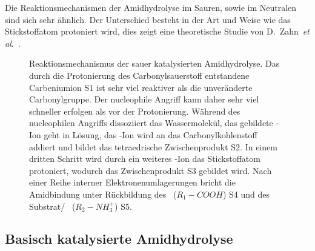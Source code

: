 Die Reaktionsmechanismen der Amidhydrolyse im Sauren, sowie im Neutralen sind sich sehr ähnlich. Der Unterschied besteht in der Art und Weise wie das Stickstoffatom protoniert wird, dies zeigt eine theoretische Studie von D.~Zahn~\textit{et al}.~\cites{Zahn.2004b}.

\begin{figure}[H]
	\begin{flushleft}
	\end{flushleft}
	\caption[Reaktionsmechanismus der sauer katalysierten Amidhydrolyse]{Reaktionsmechanismus der sauer katalysierten Amidhydrolyse. Das durch die Protonierung des Carbonylsauerstoff entstandene Carbeniumion S1 ist sehr viel reaktiver als die unveränderte Carbonylgruppe. Der nucleophile Angriff kann daher sehr viel schneller erfolgen als vor der Protonierung. Während des nucleophilen Angriffs dissoziiert das Wassermolekül, das gebildete -Ion geht in Lösung, das -Ion wird an das Carbonylkohlenstoff addiert und bildet das tetraedrische Zwischenprodukt S2. In einem dritten Schritt wird durch ein weiteres -Ion das Stickstoffatom protoniert, wodurch das Zwischenprodukt S3 gebildet wird. Nach einer Reihe interner Elektronenumlagerungen bricht die Amidbindung unter Rückbildung des \spacers~($R_1-COOH$) S4 und des Substrat/ \spitze~($R_2-NH_3^+$) S5.}
	
	\label{fig:amid_sauer}
\end{figure}

\subsection{Basisch katalysierte Amidhydrolyse}
\label{subsec:basisch_katalysierte_amidhydrolyse}

